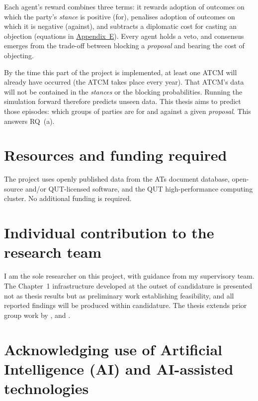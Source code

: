 Each agent's reward combines three terms: it rewards adoption of outcomes on which the party's
\textit{stance} is positive (for), penalises adoption of outcomes on which it is negative
(against), and subtracts a diplomatic cost for casting an objection (equations in
\hyperref[app:e]{Appendix~E}). Every agent holds a veto, and consensus emerges from the trade-off
between blocking a \textit{proposal} and bearing the cost of objecting.

By the time this part of the project is implemented, at least one ATCM will already have occurred
(the ATCM takes place every year). That ATCM's data will not be contained in the \textit{stances}
or the blocking probabilities. Running the simulation forward therefore predicts unseen data. This
thesis aims to predict those episodes: which groups of parties are for and against a given
\textit{proposal}. This answers RQ~(a).

\section{Resources and funding required}
\label{sec:resources}

The project uses openly published data from the ATs document database, open-source and/or
QUT-licensed software, and the QUT high-performance computing cluster. No additional funding is
required.

\section{Individual contribution to the research team}
\label{sec:contribution}

I am the sole researcher on this project, with guidance from my supervisory team.
The Chapter~1 infrastructure developed at the outset of candidature is presented not as thesis
results but as preliminary work establishing feasibility, and all reported findings will be
produced within candidature. The thesis extends prior group
work by \textcite{Botelho_CoalitionDynamics}, \textcite{Kumar_ConsistentPatterns} and \textcite{Carter_LimitsAntarctic}.

\section{Acknowledging use of Artificial Intelligence (AI) and AI-assisted technologies}
\label{sec:ai}

